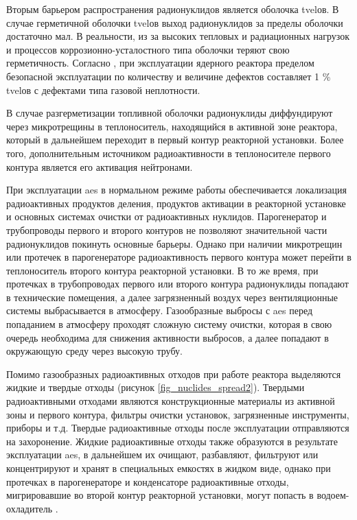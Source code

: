 Вторым барьером распространения радионуклидов является оболочка \ac{tvel}ов. В случае герметичной оболочки \ac{tvel}ов 
выход радионуклидов за пределы оболочки достаточно мал. В реальности, из за высоких тепловых и радиационных нагрузок и 
процессов коррозионно-усталостного типа оболочки теряют свою герметичность. Согласно \cite{kolpakov_tvel}, при 
эксплуатации ядерного реактора пределом безопасной эксплуатации по количеству и величине дефектов составляет 1 \% 
\ac{tvel}ов с дефектами типа газовой неплотности.

В случае разгерметизации топливной оболочки радионуклиды диффундируют через микротрещины в теплоноситель, находящийся 
в активной зоне реактора, который в дальнейшем переходит в первый контур реакторной установки. Более того, 
дополнительным источником радиоактивности в теплоносителе первого контура является его активация нейтронами. 

При эксплуатации \ac{aes} в нормальном режиме работы обеспечивается локализация радиоактивных продуктов деления, 
продуктов активации в реакторной установке и основных системах очистки от радиоактивных нуклидов. Парогенератор и 
трубопроводы первого и второго контуров не позволяют значительной части радионуклидов покинуть основные барьеры. Однако
при наличии микротрещин или протечек в парогенераторе радиоактивность первого контура может перейти в теплоноситель 
второго контура реакторной установки. В то же время, при протечках в трубопроводах первого или второго контура 
радионуклиды попадают в технические помещения, а далее загрязненный воздух через вентиляционные системы выбрасывается 
в атмосферу. Газообразные выбросы с \ac{aes} перед попаданием в атмосферу проходят сложную систему очистки, которая в 
свою очередь необходима для снижения активности выбросов, а далее попадают в окружающую среду через высокую трубу.

Помимо газообразных радиоактивных отходов при работе реактора выделяются жидкие и твердые отходы (рисунок 
\ref{fig_nuclides_spread2}). Твердыми радиоактивными отходами являются конструкционные материалы из активной зоны и 
первого контура, фильтры очистки установок, загрязненные инструменты, приборы и т.д. Твердые радиоактивные отходы после 
эксплуатации отправляются на захоронение. Жидкие радиоактивные отходы также образуются в результате эксплуатации 
\ac{aes}, в дальнейшем их очищают, разбавляют, фильтруют или концентрируют и хранят в специальных емкостях в жидком 
виде, однако при протечках в парогенераторе и конденсаторе радиоактивные отходы, мигрировавшие во второй контур 
реакторной установки, могут попасть в водоем-охладитель \cite{bekman_nuclear}. 

